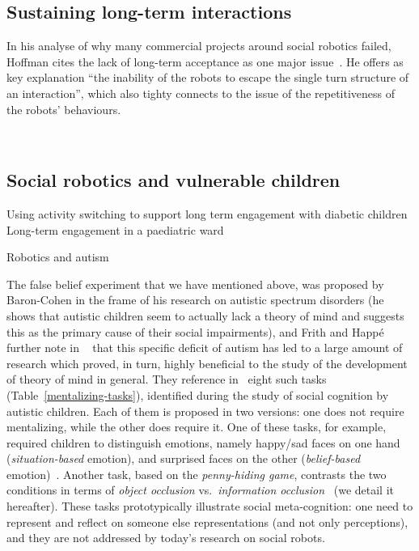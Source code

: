 \documentclass[11pt,a4paper]{report}
\begin{document}
\subsection{Sustaining long-term interactions}

In his analyse of why many commercial projects around social robotics failed,
Hoffman cites the lack of long-term acceptance as one major
issue~\cite{hoffman2019anki}. He offers as key explanation ``the inability of
the robots to escape the single turn structure of an interaction'', which also
tighty connects to the issue of the repetitiveness of the robots' behaviours.

~\cite{dereshev2019longterm}

\subsection{Social robotics and vulnerable children}

Using activity switching to support long term engagement with diabetic children~\cite{coninx2016towards}
Long-term engagement in a paediatric ward~\cite{baxter2011long}

Robotics and autism~\cite{pennisi2016autism}

The false belief experiment that we have mentioned above, was proposed by
Baron-Cohen in the frame of his research on autistic spectrum disorders (he
shows that autistic children seem to actually lack a theory of mind and suggests
this as the primary cause of their social impairments), and Frith and Happé
further note in ~\cite{frith1994autism} that this specific deficit of autism has
led to a large amount of research which proved, in turn, highly beneficial to
the study of the development of theory of mind in general. They reference
in~\cite{frith1994autism} eight such tasks (Table~\ref{mentalizing-tasks}),
identified during the study of social cognition by autistic children. Each of
them is proposed in two versions: one does not require mentalizing, while the
other does require it.  One of these tasks, for example, required children to
distinguish emotions, namely happy/sad faces on one hand (\emph{situation-based}
emotion), and surprised faces on the other (\emph{belief-based}
emotion)~\cite{baron1993children}.  Another task, based on the
\emph{penny-hiding game}, contrasts the two conditions in terms of \emph{object
occlusion} vs.~\emph{information occlusion}~\cite{baron1992out} (we detail it
hereafter). These tasks prototypically illustrate social meta-cognition: one
need to represent and reflect on someone else representations (and not only
perceptions), and they are not addressed by today's research on social robots.
\end{document}
